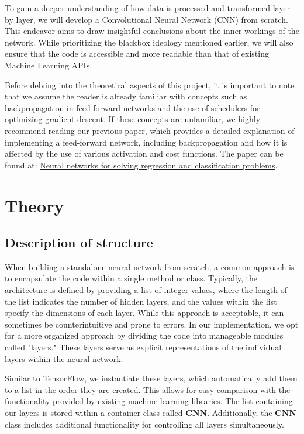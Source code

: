 \documentclass[onecolumn,10pt,cleanfoot]{asme2ej}
\begin{document}
To gain a deeper understanding of how data is processed and transformed layer by layer, we will develop a Convolutional Neural Network (CNN) from scratch. This endeavor aims to draw insightful conclusions about the inner workings of the network. While prioritizing the blackbox ideology mentioned earlier, we will also ensure that the code is accessible and more readable than that of existing Machine Learning APIs.

Before delving into the theoretical aspects of this project, it is important to note that we assume the reader is already familiar with concepts such as backpropagation in feed-forward networks and the use of schedulers for optimizing gradient descent. If these concepts are unfamiliar, we highly recommend reading our previous paper, which provides a detailed explanation of implementing a feed-forward network, including backpropagation and how it is affected by the use of various activation and cost functions. The paper can be found at: \href{https://github.com/EricEReber/FFNN_optimization/blob/main/doc/paper.pdf}{\color{blue}Neural networks for solving regression and classification problems}.

\section{Theory}

\subsection{Description of structure}
When building a standalone neural network from scratch, a common approach is to encapsulate the code within a single method or class. Typically, the architecture is defined by providing a list of integer values, where the length of the list indicates the number of hidden layers, and the values within the list specify the dimensions of each layer. While this approach is acceptable, it can sometimes be counterintuitive and prone to errors. In our implementation, we opt for a more organized approach by dividing the code into manageable modules called "layers." These layers serve as explicit representations of the individual layers within the neural network.

Similar to TensorFlow, we instantiate these layers, which automatically add them to a list in the order they are created. This allows for easy comparison with the functionality provided by existing machine learning libraries. The list containing our layers is stored within a container class called \textbf{CNN}. Additionally, the \textbf{CNN} class includes additional functionality for controlling all layers simultaneously.
\end{document}
